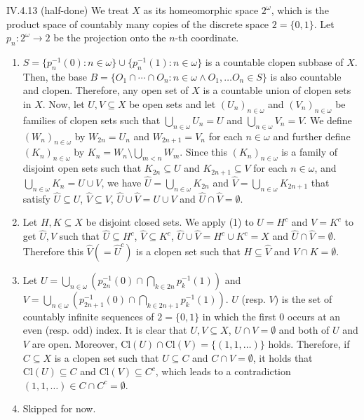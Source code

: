 \documentclass[12pt]{article}
\begin{document}
\begin{customthm}{IV.4.13} (half-done)
  We treat $X$ as its homeomorphic space $2^\omega$, which is the product space of countably many copies of the discrete space $2=\{0,1\}$. Let $p_n:2^\omega\rightarrow 2$ be the projection onto the $n$-th coordinate.
  \begin{enumerate}
    \item $S=\{p_n^{-1}(0):n\in\omega\}\cup\{p_n^{-1}(1):n\in\omega\}$ is a countable clopen subbase of $X$. Then, the base $B=\{O_1\cap\cdots\cap O_n:n\in\omega\wedge O_1,\ldots O_n\in S\}$ is also countable and clopen. Therefore, any open set of $X$ is a countable union of clopen sets in $X$. Now, let $U,V\subseteq X$ be open sets and let $(U_n)_{n\in\omega}$ and $(V_n)_{n\in\omega}$ be families of clopen sets such that $\bigcup_{n\in\omega}U_n=U$ and $\bigcup_{n\in\omega}V_n=V$. We define $(W_n)_{n\in\omega}$ by $W_{2n}=U_n$ and $W_{2n+1}=V_n$ for each $n\in\omega$ and further define $(K_n)_{n\in\omega}$ by $K_n=W_n\setminus\bigcup_{m<n}W_m$. Since this $(K_n)_{n\in\omega}$ is a family of disjoint open sets such that $K_{2n}\subseteq U$ and $K_{2n+1}\subseteq V$ for each $n\in\omega$, and $\bigcup_{n\in\omega}K_n=U\cup V$, we have $\hat{U}=\bigcup_{n\in\omega}K_{2n}$ and $\hat{V}=\bigcup_{n\in\omega}K_{2n+1}$ that satisfy $\hat{U}\subseteq U$, $\hat{V}\subseteq V$, $\hat{U}\cup\hat{V}=U\cup V$ and $\hat{U}\cap\hat{V}=\emptyset$.
    \item Let $H,K\subseteq X$ be disjoint closed sets. We apply (1) to $U=H^c$ and $V=K^c$ to get $\hat{U},\hat{V}$ such that $\hat{U}\subseteq H^c$, $\hat{V}\subseteq K^c$, $\hat{U}\cup\hat{V}=H^c\cup K^c=X$ and $\hat{U}\cap\hat{V}=\emptyset$. Therefore this $\hat{V}(=\hat{U}^c)$ is a clopen set such that $H\subseteq\hat{V}$ and $\hat{V}\cap K=\emptyset$.
    \item Let $U=\bigcup_{n\in\omega}\left(p_{2n}^{-1}(0)\cap\bigcap_{k\in2n}p_k^{-1}(1)\right)$ and $V=\bigcup_{n\in\omega}\left(p_{2n+1}^{-1}(0)\cap\bigcap_{k\in2n+1}p_k^{-1}(1)\right)$. $U$ (resp. $V$) is the set of countably infinite sequences of $2=\{0,1\}$ in which the first $0$ occurs at an even (resp. odd) index. It is clear that $U,V\subseteq X$, $U\cap V=\emptyset$ and both of $U$ and $V$ are open. Moreover, $\mathrm{Cl}(U)\cap\mathrm{Cl}(V)=\{(1,1,\ldots)\}$ holds. Therefore, if $C\subseteq X$ is a clopen set such that $U\subseteq C$ and $C\cap V=\emptyset$, it holds that $\mathrm{Cl}(U)\subseteq C$ and $\mathrm{Cl}(V)\subseteq C^c$, which leads to a contradiction $(1,1,\ldots)\in C\cap C^c=\emptyset$.
    \item Skipped for now.
  \end{enumerate}
\end{customthm}
\end{document}
